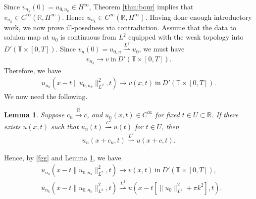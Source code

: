 \documentclass[12pt,reqno]{amsart}
\numberwithin{equation}{section}  %
\newcommand{\rr}{\mathbb{R}}
\newcommand{\ci}{\mathbb{T}}
\newtheorem{lemma}[theorem]{Lemma}
\begin{document}
%
%
Since $v_{n_{k}}(0) = u_{0,n_{k}} \in
H^{\infty}$, Theorem \ref{thm:bour} implies that $v_{n_{k}}\in C^{\infty}(\rr,
H^{\infty})$. Hence $u_{n_{k}} \in C^{\infty}(\rr, H^{\infty})$. Having done
enough introductory work, we now prove ill-posedness via contradiction. 
Assume that the data to soluion map at $u_{0}$ is continuous from
$L^{2}$ equipped with the weak topology into $D'\left( \ci \times [0,T]
\right)$. Since $v_{n}(0) = u_{0,n} \overset{L^{2}}{\rightharpoonup}
u_{0}$, we must have %
%
\begin{equation*}
\begin{split}
  v_{n_{k}} \to v \ \text{in} \ D'\left( \ci \times [0,T] \right).
\end{split}
\end{equation*}
%
%
Therefore, we have
%
%
%
%
%
%
\begin{equation}
  \label{fgg}
\begin{split}
  u_{n_{k}}(x - t \| u_{0,n_{k}} \|_{L^{2}}^{2}, t) \to v(x,t) \ \text{in} \
  D'\left( \ci \times [0,T] \right).
\end{split}
\end{equation}
%
We now need the following.
%
%
%
%
%
%
%
%
%
%
%
%
%
%
%
%
%
%
%
%
%
%
\begin{lemma}
  Suppose $c_{n} \xrightarrow{\rr} c$, and $u_{n}(x,t) \in C^{\infty}$ for fixed $t
  \in U \subset \rr$. If there exists $u(x,t)$ such that $u_{n}(t)
  \overset{L^{2}}{\rightharpoonup} u(t)$ for $t \in U$, then
  \begin{equation*}
  \begin{split}
    u_{n}(x + c_{n}, t)\overset{L^{2}}{\rightharpoonup} u(x + c, t).
  \end{split}
  \end{equation*}
%
%
\label{lem:key-conv}
\end{lemma}
%
%
%
%
Hence, by \eqref{fgg} and Lemma \ref{lem:key-conv}, we have
%
%
\begin{equation*}
\begin{split}
& u_{n_{k}}(x - t \| u_{0,n_{k}} \|_{L^{2}}^{2}, t) \to v(x,t) \ \text{in} \
  D'\left( \ci \times [0,T] \right),
  \\
  & u_{n_{k}}(x - t \| u_{0,n_{k}} \|_{L^{2}}^{2}, t) 
  \overset{L^{2}}{\rightharpoonup}
  u(x - t [\| u_{0} \|_{L^{2}}^{2} + \pi k^{2}], t).
\end{split}
\end{equation*}
\end{document}
